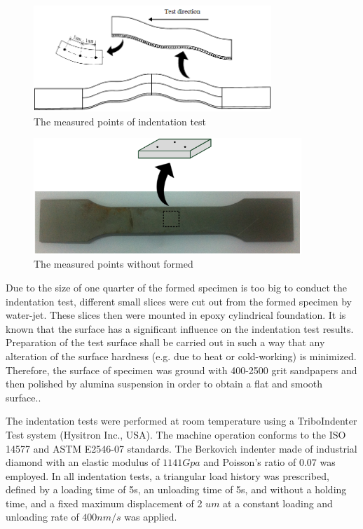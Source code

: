 \documentclass[review]{elsarticle}
\begin{document}
\begin{figure}[h]
\centering
\includegraphics[width=0.8\textwidth]{./figs/Drawing2.png}
\caption{The measured points of indentation test}
\label{fig:measuredindentation}
\end{figure}

\begin{figure}[h]
\centering
\includegraphics[width=0.9\textwidth]{./figs/Drawing3.png}
\caption{The measured points without formed}
\label{fig:measuredtension}
\end{figure}

Due to the size of one quarter of the formed specimen is too big to conduct the indentation test, different small slices were cut out from the formed specimen by water-jet. These slices then were mounted in epoxy cylindrical foundation. It is known that the surface has a significant influence on the indentation test results. Preparation of the test surface shall be carried out in such a way that any alteration of the surface hardness (e.g. due to heat or cold-working) is minimized. Therefore, the surface of specimen was ground with 400-2500 grit sandpapers and then polished by alumina suspension in order to obtain a flat and smooth surface..


The indentation tests were performed at room temperature using a TriboIndenter Test system (Hysitron Inc., USA). The machine operation conforms to the ISO 14577 and ASTM E2546-07 standards. The Berkovich indenter made of industrial diamond with an elastic modulus of $1141 Gpa$ and Poisson's ratio of 0.07 was employed. In all indentation tests, a triangular load history was prescribed, defined by a loading time of 5s, an unloading time of 5s, and without a holding time, and a fixed maximum displacement of 2 $um$ at a constant loading and unloading rate of $400nm/s$ was applied.
\end{document}
